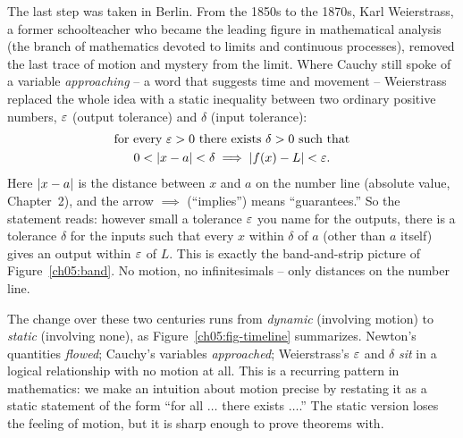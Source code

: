 The last step was taken in Berlin. From the 1850s to the 1870s, Karl Weierstrass, a former
schoolteacher who became the leading figure in mathematical analysis (the branch of mathematics
devoted to limits and continuous processes), removed the last trace of motion and mystery from
the limit. Where Cauchy still spoke of a variable \emph{approaching} -- a word that suggests time
and movement -- Weierstrass replaced the whole idea with a static inequality between two
ordinary positive numbers, $\varepsilon$ (output tolerance) and $\delta$ (input tolerance):
\[
  \begin{gathered}
  \text{for every } \varepsilon > 0 \text{ there exists } \delta > 0 \text{ such that}\\
  0 < \lvert x-a\rvert < \delta \implies \lvert f(x)-L\rvert < \varepsilon.
  \end{gathered}
\]
Here $\lvert x-a\rvert$ is the distance between $x$ and $a$ on the number
line (absolute value, Chapter~2), and the arrow $\implies$ (``implies'') means ``guarantees.'' So the statement reads: however small a
tolerance $\varepsilon$ you name for the outputs, there is a tolerance $\delta$ for the inputs such that
every $x$ within $\delta$ of $a$ (other than $a$ itself) gives an output within $\varepsilon$ of $L$.
This is exactly the band-and-strip picture of Figure~\ref{ch05:band}. No motion, no
infinitesimals -- only distances on the number line.

\begin{aestheticbox}
The change over these two centuries runs from \emph{dynamic} (involving motion) to \emph{static}
(involving none), as Figure~\ref{ch05:fig-timeline} summarizes. Newton's
quantities \emph{flowed}; Cauchy's variables \emph{approached}; Weierstrass's $\varepsilon$ and $\delta$
\emph{sit} in a logical relationship with no motion at all. This is a recurring pattern
in mathematics: we make an intuition about motion precise by restating it as a static statement
of the form ``for all $\dots$ there exists $\dots$.'' The static version loses the feeling of
motion, but it is sharp enough to prove theorems with.
\end{aestheticbox}

